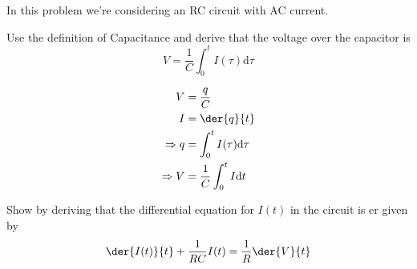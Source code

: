 \begin{intro}
	In this problem we're considering an RC circuit with AC current.
\end{intro}
\begin{problem}
	Use the definition of Capacitance and derive that the voltage over the capacitor is
	\[ V=\frac{1}{C}\int_{0}^{t} I(\tau)\mathrm d \tau \]
\end{problem}
\begin{solution}
	\begin{align*}
		V             &= \frac{q}{C}                           \\
		I             &= \der{q}{t}                          \\
		\Rightarrow q &=\int_{0}^{t} I(\tau)\mathrm d \tau     \\
		\Rightarrow V &= \frac{1}{C}\int_{0}^{t} I \mathrm d t
	\end{align*}
\end{solution}
\begin{problem}
	Show by deriving that the differential equation for \( I(t) \) in the circuit
  is er given by
	\[ \der{I(t)}{t}+\frac1{RC}I(t)=\frac{1}{R}\der{V}{t} \]
\end{problem}

